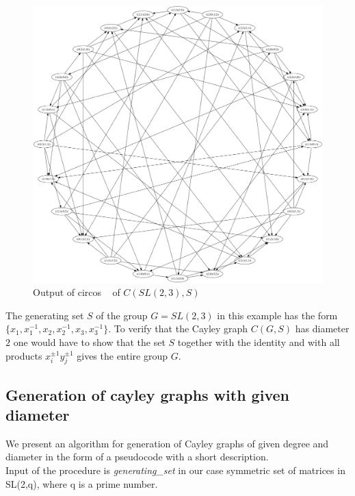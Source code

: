 \documentclass[a4paper,12pt,oneside]{report}%
\begin{document}
\begin{figure}[!ht]
	\centering
	\includegraphics[scale=0.25]{example.png}
	\caption{ Output of circos ~\cite{Circos} of $C(SL(2,3), S)$ }
\end{figure}

The generating set $S$ of the group $G=SL(2,3)$ in this example has the form $\{ x_1,x_1^{-1},x_2,x_2^{-1},x_3,x_3^{-1}\}$. To verify that the Cayley graph $C(G,S)$ has diameter $2$ one would have to show that the set $S$ together with the identity and with all products $x_i^{\pm 1}y_j^{\pm 1}$ gives the entire group $G$.

\lstset{
	basicstyle=\footnotesize,
	tabsize=2
}

\subsection{Generation of cayley graphs with given diameter}

We present an algorithm for generation of Cayley graphs of given degree and diameter in the form of a pseudocode with a short description. ~ \\
Input of the procedure is {\em generating\_set} in our case symmetric set of matrices in SL(2,q), where q is a prime number.
\end{document}
